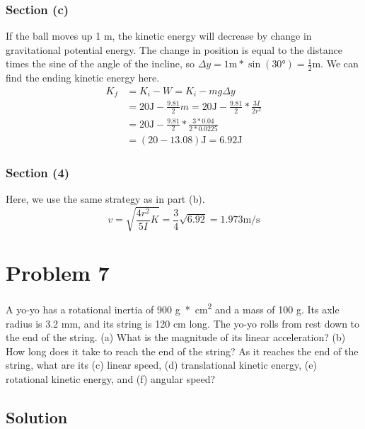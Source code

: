 \documentclass[12pt]{article}
\begin{document}
\subsubsection{Section (c)}
If the ball moves up 1 m, the kinetic energy will decrease by change in gravitational potential energy. The change in position is equal to the distance times the sine of the angle of the incline, so \(\Delta y = 1\unit{\meter} * \sin(30\unit{\degree}) = \frac{1}{2}\unit{\meter}\). We can find the ending kinetic energy here.
\begin{align}
    K_f &=  K_i - W
        =   K_i - mg\Delta y\\
        &=  20\unit{\joule} - \frac{9.81}{2}m
        =   20\unit{\joule} - \frac{9.81}{2}*\frac{3I}{2r^2}\\
        &=  20\unit{\joule} - \frac{9.81}{2}*\frac{3*0.04}{2*0.0225}\\
        &=  (20 - 13.08)\unit{\joule}
        =   \boxed{6.92\unit{\joule}}
\end{align}

\subsubsection{Section (4)}
Here, we use the same strategy as in part (b). 
\begin{equation}
    v   =   \sqrt{\frac{4r^2}{5I}K}
        =   \frac{3}{4}\sqrt{6.92}
        =   \boxed{1.973\unit{\meter/\second}}
\end{equation}


\pagebreak
\section{Problem 7}
A yo-yo has a rotational inertia of 900 \unit{\gram*\centi\meter^2} and a mass of 100 g. Its axle radius is 3.2 mm, and its string is 120 cm long. The yo-yo rolls from rest down to the end of the string. (a) What is the magnitude of its linear acceleration? (b) How long does it take to reach the end of the string? As it reaches the end of the string, what are its (c) linear speed, (d) translational kinetic energy, (e) rotational kinetic energy, and (f) angular speed?

\subsection{Solution}
\end{document}

